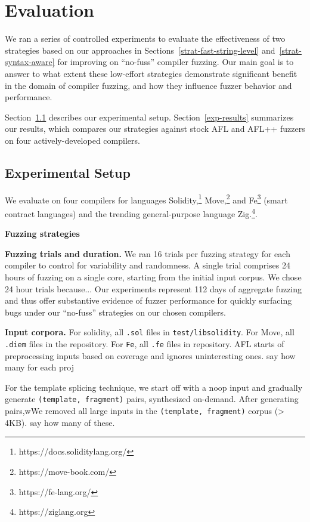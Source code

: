 \section{Evaluation}
\label{eval}

We ran a series of controlled experiments to evaluate the effectiveness of two
strategies based on our approaches in Sections~\ref{strat-fast-string-level}
and~\ref{strat-syntax-aware} for improving on ``no-fuss'' compiler fuzzing. Our
main goal is to answer to what extent these low-effort strategies demonstrate
significant benefit in the domain of compiler fuzzing, and how they influence
fuzzer behavior and performance.

Section~\ref{exp-setup} describes our experimental setup.
Section~\ref{exp-results} summarizes our results, which compares our strategies
against stock AFL and AFL++ fuzzers on four actively-developed compilers. 

\subsection{Experimental Setup}
\label{exp-setup}

We evaluate on four compilers for languages Solidity,\footnote{https://docs.soliditylang.org/}
Move,\footnote{https://move-book.com/} and Fe\footnote{https://fe-lang.org/} (smart contract languages)
and the trending general-purpose language Zig.\footnote{https://ziglang.org}. 


\noindent
\textbf{Fuzzing strategies}

\noindent \textbf{Fuzzing trials and duration.} We ran 16 trials per fuzzing
strategy for each compiler to control for variability and randomness. A single
trial comprises 24 hours of fuzzing on a single core, starting from the initial input corpus.
We chose 24 hour trials because...
Our experiments represent 112 days of aggregate fuzzing and thus offer
substantive evidence of fuzzer performance for quickly surfacing bugs under our
``no-fuss'' strategies on our chosen compilers.


\noindent 
\textbf{Input corpora.} For solidity, all \texttt{.sol} files in
\texttt{test/libsolidity}. For Move, all \texttt{.diem} files in the
repository. For \texttt{Fe}, {\color{red} all \texttt{.fe} files in
repository}. AFL starts of preprocessing inputs based on coverage and ignores uninteresting ones. {\color{red} say how many for each proj}

For the template splicing technique, we start off with a noop input and
gradually generate \texttt{(template, fragment)} pairs, synthesized on-demand.
After generating pairs,wWe removed all large inputs in the \texttt{(template, fragment)} corpus (> 4KB). {\color{red} say how many of these}.


